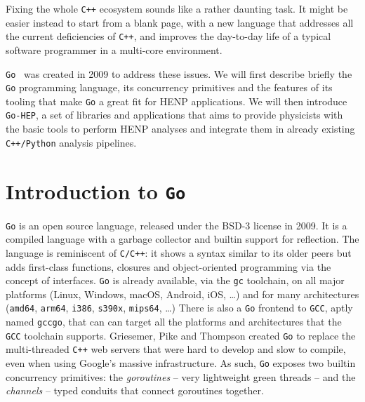 \documentclass[a4paper]{jpconf}
\begin{document}
Fixing the whole \texttt{C++} ecosystem sounds like a rather daunting task.
It might be easier instead to start from a blank page, with a new language that addresses all the current deficiencies of \texttt{C++}, and improves the day-to-day life of a typical software programmer in a multi-core environment.

\texttt{Go}~\cite{ref-golang} was created in 2009 to address these issues.
We will first describe briefly the \texttt{Go} programming language, its concurrency primitives and the features of its tooling that make \texttt{Go} a great fit for HENP applications.
We will then introduce \texttt{Go-HEP}, a set of libraries and applications that aims to provide physicists with the basic tools to perform HENP analyses and integrate them in already existing \texttt{C++/Python} analysis pipelines.

\section{Introduction to \texttt{Go}}

\texttt{Go} is an open source language, released under the BSD-3 license in 2009.
It is a compiled language with a garbage collector and builtin support for reflection.
The language is reminiscent of \texttt{C/C++}: it shows a syntax similar to its older peers but adds first-class functions, closures and object-oriented programming via the concept of interfaces.
\texttt{Go} is already available, via the \texttt{gc} toolchain, on all major platforms (Linux, Windows, macOS, Android, iOS, \ldots) and for many architectures (\texttt{amd64}, \texttt{arm64}, \texttt{i386}, \texttt{s390x}, \texttt{mips64}, \ldots)
There is also a \texttt{Go} frontend to \texttt{GCC}, aptly named \texttt{gccgo}, that can can target all the platforms and architectures that the \texttt{GCC} toolchain supports.
Griesemer, Pike and Thompson created \texttt{Go} to replace the multi-threaded \texttt{C++} web servers that were hard to develop and slow to compile, even when using Google's massive infrastructure.
As such, \texttt{Go} exposes two builtin concurrency primitives: the \emph{goroutines} -- very lightweight green threads -- and the \emph{channels} -- typed conduits that connect goroutines together.


\end{document}
